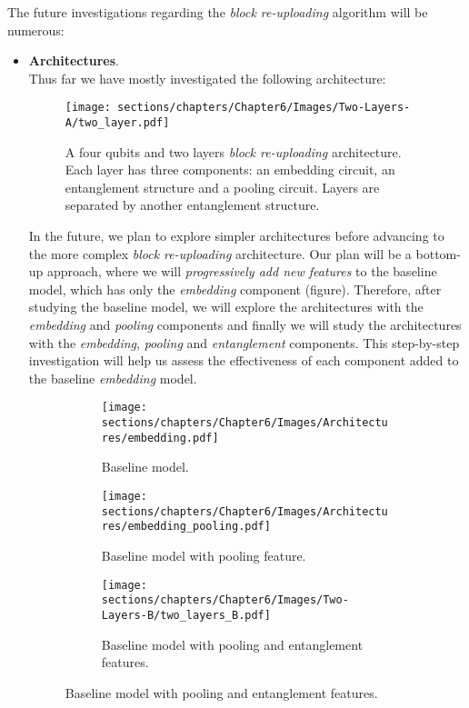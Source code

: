 
The future investigations regarding the \textit{block re-uploading} algorithm will be numerous:

\begin{itemize}
    \item \textbf{Architectures}.\\
    Thus far we have mostly investigated the following architecture:

    \begin{figure}[h]
        \centering
        \texttt{[image: sections/chapters/Chapter6/Images/Two-Layers-A/two\_layer.pdf]}
        \caption{A four qubits and two layers \textit{block re-uploading} architecture. Each layer has three 
        components: an embedding circuit, an entanglement structure and a pooling circuit.
        Layers are separated by another entanglement structure.}
    \end{figure}

    In the future, we plan to explore simpler architectures before advancing to the more 
    complex \textit{block re-uploading} architecture. 
    Our plan will be a bottom-up approach, where we will \textit{progressively add new features} to the baseline model, 
    which has only the \textit{embedding} component (figure).
    Therefore, after studying the baseline model, we will explore the architectures with the 
    \textit{embedding} and \textit{pooling} components and finally we will study the architectures 
    with the \textit{embedding}, \textit{pooling} and \textit{entanglement} components.
    This step-by-step investigation will 
    help us assess the effectiveness of each component added to the baseline \textit{embedding} model.

    \begin{figure}[h]
        \centering
        \begin{subfigure}[b]{0.45\textwidth}
            \texttt{[image: sections/chapters/Chapter6/Images/Architectures/embedding.pdf]}
        \caption*{Baseline model.}
        \end{subfigure}
        \begin{subfigure}[b]{0.45\textwidth}
            \texttt{[image: sections/chapters/Chapter6/Images/Architectures/embedding\_pooling.pdf]}
        \caption*{Baseline model with pooling feature.}
        \end{subfigure}
        \begin{subfigure}[b]{\textwidth}
            \centering
            \texttt{[image: sections/chapters/Chapter6/Images/Two-Layers-B/two\_layers\_B.pdf]}
        \caption*{Baseline model with pooling and entanglement features.}
        \end{subfigure}
    \end{figure}


\end{itemize}
